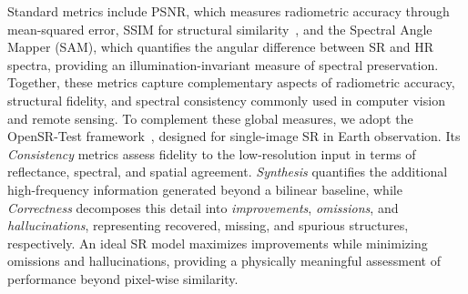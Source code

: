 \documentclass[journal]{IEEEtran}
\begin{document}
Standard metrics include PSNR, which measures radiometric accuracy through mean-squared error, SSIM for structural similarity~\cite{ssim}, and the Spectral Angle Mapper (SAM), which quantifies the angular difference between SR and HR spectra, providing an illumination-invariant measure of spectral preservation. Together, these metrics capture complementary aspects of radiometric accuracy, structural fidelity, and spectral consistency commonly used in computer vision and remote sensing. To complement these global measures, we adopt the OpenSR-Test framework~\cite{opensrtest}, designed for single-image SR in Earth observation. Its \textit{Consistency} metrics assess fidelity to the low-resolution input in terms of reflectance, spectral, and spatial agreement. \textit{Synthesis} quantifies the additional high-frequency information generated beyond a bilinear baseline, while \textit{Correctness} decomposes this detail into \textit{improvements}, \textit{omissions}, and \textit{hallucinations}, representing recovered, missing, and spurious structures, respectively. An ideal SR model maximizes improvements while minimizing omissions and hallucinations, providing a physically meaningful assessment of performance beyond pixel-wise similarity.
\end{document}
